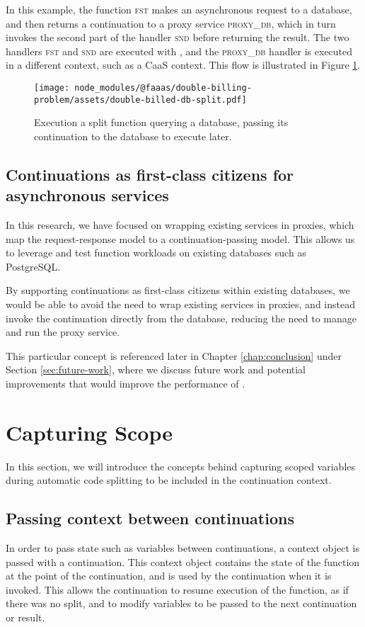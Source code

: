 In this example, the function \textsc{fst} makes an asynchronous request to a database, and then returns a continuation to a proxy service \textsc{proxy_db}, which in turn invokes the second part of the handler \textsc{snd} before returning the result. The two handlers \textsc{fst} and \textsc{snd} are executed with \faas{}, and the \textsc{proxy_db} handler is executed in a different context, such as a CaaS context. This flow is illustrated in Figure \ref{fig:double-billing-db-split}.

\begin{figure}
    \centering\texttt{[image: node\_modules/@faaas/double-billing-problem/assets/double-billed-db-split.pdf]}
    \caption{Execution a split function querying a database, passing its continuation to the database to execute later.}
    \label{fig:double-billing-db-split}
\end{figure}

\subsection{Continuations as first-class citizens for asynchronous services}
In this research, we have focused on wrapping existing services in proxies, which map the request-response model to a continuation-passing model. This allows us to leverage and test function workloads on existing databases such as PostgreSQL.

By supporting continuations as first-class citizens within existing databases, we would be able to avoid the need to wrap existing services in proxies, and instead invoke the continuation directly from the database, reducing the need to manage and run the proxy service.

This particular concept is referenced later in Chapter \ref{chap:conclusion} under Section \ref{sec:future-work}, where we discuss future work and potential improvements that would improve the performance of \faaas{}.

\section{Capturing Scope}
In this section, we will introduce the concepts behind capturing scoped variables during automatic code splitting to be included in the continuation context.

\subsection{Passing context between continuations}
In order to pass state such as variables between continuations, a context object is passed with a continuation. This context object contains the state of the function at the point of the continuation, and is used by the continuation when it is invoked. This allows the continuation to resume execution of the function, as if there was no split, and to modify variables to be passed to the next continuation or result.

